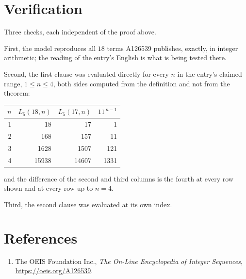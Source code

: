 \documentclass[11pt,a4paper]{article}
\theoremstyle{plain}
\theoremstyle{definition}
\begin{document}
\section{Verification}

Three checks, each independent of the proof above.

First, the model reproduces all $18$ terms A126539 publishes, exactly, in integer
arithmetic; the reading of the entry's English is what is being tested there.

Second, the first clause was evaluated directly for every $n$ in the entry's claimed range,
$1\le n\le4$, both sides computed from the definition and not from the theorem:

\begin{center}
\begin{tabular}{rrrr}
$n$ & $L_{5}(18,n)$ & $L_{5}(17,n)$ & $11^{\,n-1}$ \\ \hline
1 & 18 & 17 & 1 \\
2 & 168 & 157 & 11 \\
3 & 1628 & 1507 & 121 \\
4 & 15938 & 14607 & 1331 \\
\end{tabular}
\end{center}

\noindent and the difference of the second and third columns is the fourth at every row shown
and at every row up to $n=4$.

Third, the second clause was evaluated at its own index.

\section*{References}
\begin{enumerate}
\item The OEIS Foundation Inc., \emph{The On-Line Encyclopedia of Integer Sequences},
\url{https://oeis.org/A126539}.
\end{enumerate}
\end{document}

